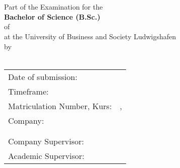 \thispagestyle{empty}
\begin{titlepage}
\enlargethispage{4cm}

\begin{figure}           %
	\begin{minipage}{0.49\textwidth}
		\flushleft
	\end{minipage}
	\hfill
	\begin{minipage}{0.49\textwidth}
		
	\end{minipage}
	\hfill
\end{figure} 
\vspace*{0.1cm}

\begin{center}
	\huge{\textbf{\titel}}\\[1.5cm]
	\Large{\textbf{\arbeit}}\\[0.5cm]
	\normalsize{Part of the Examination for the\\[1ex] \textbf{Bachelor of Science (B.Sc.)}}\\[0.5cm]
	\Large{of \studiengang}\\[1ex]
	\normalsize{at the University of Business and Society Ludwigshafen}\\[1cm]
	\normalsize{by}\\[1ex] \Large{\textbf{\autor}} \\[1cm]
\end{center}

\begin{center}
	\vfill
	\begin{tabular}{ll}
		Date of submission:                     & \abgabe \\[0.2cm]
		Timeframe:            & \bearbeitungszeitraum \\[0.2cm]
		Matriculation Number, Kurs:            & \matrikelnr , \kurs \\[0.2cm]
		Company:                & \firmaName \\
		                                 & \firmaStrasse \\
		                                 & \firmaPlz \\[0.2cm]
		Company Supervisor:   & \betreuerFirma \\[0.2cm]
		Academic Supervisor: & \betreuerDhbw \\[2cm]
	\end{tabular} 
\end{center}
\end{titlepage}
